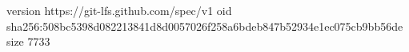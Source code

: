 version https://git-lfs.github.com/spec/v1
oid sha256:508bc5398d082213841d8d0057026f258a6bdeb847b52934e1ec075cb9bb56de
size 7733
